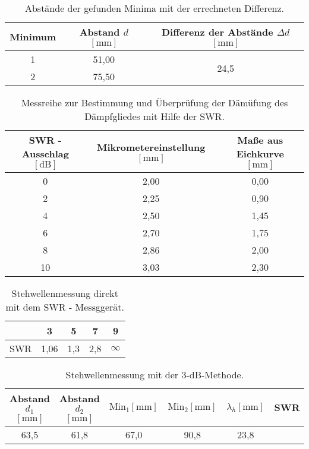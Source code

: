       \begin{table}
           \centering
           \caption{Abstände der gefunden Minima mit der errechneten Differenz.}
           \label{tab:Messreihe21}
           \begin{tabular}{c c | c}
               \toprule
               Minimum & Abstand $d$ $[\si{\milli\meter}]$ & Differenz der Abstände $ \Delta d$ $ [\si{\milli\meter}]$ \\
               \midrule
               1 & 51,00 & \multirow{2}{*}{24,5} \\
               2 & 75,50 &  \\
           \end{tabular}
       \end{table}


\begin{table}
    \centering
    \caption{Messreihe zur Bestimmung und Überprüfung der Dämüfung des Dämpfgliedes mit Hilfe der SWR.}
    \label{tab:Messreihe22}
    \begin{tabular}{c c c}
        \toprule
       SWR - Ausschlag $[\si{\dB}]$ & Mikrometereinstellung $[\si{\milli\meter}]$ & Maße aus Eichkurve $[\si{\milli\meter}]$  \\
        \midrule
        0   & 2,00 & 0,00 \\
        2   & 2,25 & 0,90 \\
        4   & 2,50 & 1,45 \\
        6   & 2,70 & 1,75 \\
        8   & 2,86 & 2,00 \\
        10  & 3,03 & 2,30 \\        
    \end{tabular}
\end{table}


\begin{table}
    \centering
    \caption{Stehwellenmessung direkt mit dem SWR - Messggerät. }
    \label{tab:Messreihe31}
    \begin{tabular}{c c c c c}
        \toprule
        ~ &  3 & 5 & 7 & 9 \\
        \midrule
       SWR & 1,06 & 1,3 & 2,8 & $\infty$ \\   
     \end{tabular}
\end{table}

\begin{table}
    \centering
    \caption{Stehwellenmessung mit der 3-dB-Methode.}
    \label{tab:Messreihe32}
    \begin{tabular}{c c c c c c }
        \toprule
        Abstand $d_1$ $[\si{\milli\meter}]$ & Abstand $d_2$ $[\si{\milli\meter}]$ & $\text{Min}_1 [\si{\milli\meter}]$&  $\text{Min}_2 [\si{\milli\meter}]$ & $\lambda_h [\si{\milli\meter}]$ & SWR \\
        \midrule
        63,5 & 61,8  & 67,0  & 90,8 & 23,8 & \\   
     \end{tabular}
\end{table}

